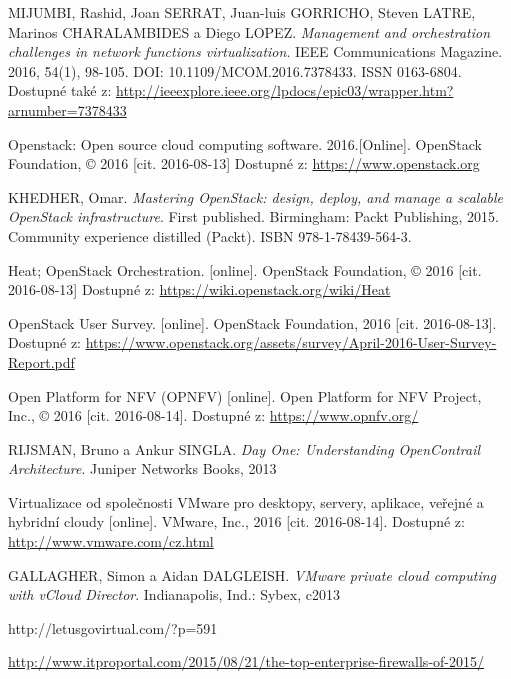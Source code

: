 \begin{thebibliography}{10}
MIJUMBI, Rashid, Joan SERRAT, Juan-luis GORRICHO, Steven LATRE, Marinos CHARALAMBIDES a Diego LOPEZ. \emph{Management and orchestration challenges in network functions virtualization}. IEEE Communications Magazine. 2016, 54(1), 98-105. DOI: 10.1109/MCOM.2016.7378433. ISSN 0163-6804. Dostupné také z: \url{http://ieeexplore.ieee.org/lpdocs/epic03/wrapper.htm?arnumber=7378433}

 Openstack:  Open  source  cloud  computing  software.  2016.[Online]. OpenStack Foundation, © 2016 [cit. 2016-08-13] Dostupné z: \url{https://www.openstack.org}

 KHEDHER, Omar. \emph{Mastering OpenStack: design, deploy, and manage a scalable OpenStack infrastructure}. First published. Birmingham: Packt Publishing, 2015. Community experience distilled (Packt). ISBN 978-1-78439-564-3.

Heat; OpenStack Orchestration. [online]. OpenStack Foundation, © 2016 [cit. 2016-08-13] Dostupné z: \url{https://wiki.openstack.org/wiki/Heat}

 OpenStack User Survey. [online]. OpenStack Foundation, 2016 [cit. 2016-08-13]. Dostupné z: \url{https://www.openstack.org/assets/survey/April-2016-User-Survey-Report.pdf}

 Open Platform for NFV (OPNFV) [online]. Open Platform for NFV Project, Inc., © 2016 [cit. 2016-08-14]. Dostupné z: \url{https://www.opnfv.org/}

 RIJSMAN, Bruno a Ankur SINGLA. \emph{Day One: Understanding OpenContrail Architecture}. Juniper Networks Books, 2013

 Virtualizace od společnosti VMware pro desktopy, servery, aplikace, veřejné a hybridní cloudy [online]. VMware, Inc., 2016 [cit. 2016-08-14]. Dostupné z: \url{http://www.vmware.com/cz.html}

GALLAGHER, Simon a Aidan DALGLEISH. \emph{VMware private cloud computing with vCloud Director}. Indianapolis, Ind.: Sybex, c2013

 http://letusgovirtual.com/?p=591

 \url{http://www.itproportal.com/2015/08/21/the-top-enterprise-firewalls-of-2015/}





\end{thebibliography}
